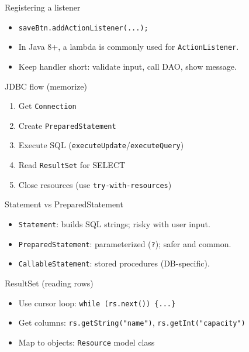 \documentclass{beamer}
\begin{document}
\begin{frame}{Registering a listener}
  \begin{itemize}[<+->]
    \item \texttt{saveBtn.addActionListener(...);}
    \item In Java 8+, a lambda is commonly used for \texttt{ActionListener}.
    \item Keep handler short: validate input, call DAO, show message.
  \end{itemize}
  \slidesources{\OOPSUnitIVSources}
\end{frame}

\begin{frame}{JDBC flow (memorize)}
  \begin{enumerate}[<+->]
    \item Get \texttt{Connection}
    \item Create \texttt{PreparedStatement}
    \item Execute SQL (\texttt{executeUpdate}/\texttt{executeQuery})
    \item Read \texttt{ResultSet} for SELECT
    \item Close resources (use \texttt{try-with-resources})
  \end{enumerate}
  \slidesources{\OOPSUnitIVSources}
\end{frame}

\begin{frame}{Statement vs PreparedStatement}
  \begin{itemize}[<+->]
    \item \texttt{Statement}: builds SQL strings; risky with user input.
    \item \texttt{PreparedStatement}: parameterized (\texttt{?}); safer and common.
    \item \texttt{CallableStatement}: stored procedures (DB-specific).
  \end{itemize}
  \slidesources{\OOPSUnitIVSources}
\end{frame}

\begin{frame}{ResultSet (reading rows)}
  \begin{itemize}[<+->]
    \item Use cursor loop: \texttt{while (rs.next()) \{...\}}
    \item Get columns: \texttt{rs.getString("name")}, \texttt{rs.getInt("capacity")}
    \item Map to objects: \texttt{Resource} model class
  \end{itemize}
  \slidesources{\OOPSUnitIVSources}
\end{frame}
\end{document}
